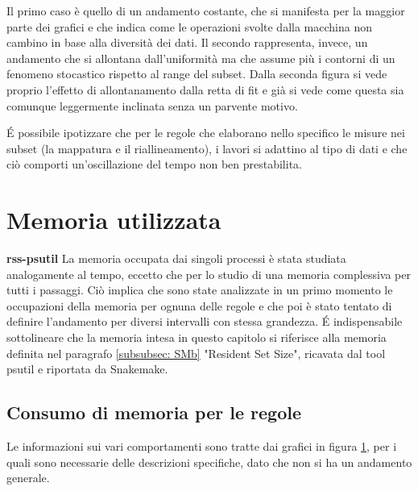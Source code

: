 Il primo caso è quello di un andamento costante, che si manifesta per la maggior parte dei grafici e che indica come le operazioni svolte dalla macchina non cambino in base alla diversità dei dati.
Il secondo rappresenta, invece, un andamento che si allontana dall'uniformità ma che assume più i contorni di un fenomeno stocastico rispetto al range del subset.
Dalla seconda figura si vede proprio l'effetto di allontanamento dalla retta di fit e già si vede come questa sia comunque leggermente inclinata senza un parvente motivo.

\'E possibile ipotizzare che per le regole che elaborano nello specifico le misure nei subset (la mappatura e il riallineamento), i lavori si adattino al tipo di dati e che ciò comporti un'oscillazione del tempo non ben prestabilita.

\section{Memoria utilizzata}
\textbf{rss-psutil}
La memoria occupata dai singoli processi è stata studiata analogamente al tempo, eccetto che per lo studio di una memoria complessiva per tutti i passaggi. 
Ciò implica che sono state analizzate in un primo momento le occupazioni della memoria per ognuna delle regole e che poi è stato tentato di definire l'andamento per diversi intervalli con stessa grandezza.
\'E indispensabile sottolineare che la memoria intesa in questo capitolo si riferisce alla memoria definita nel paragrafo \ref{subsubsec: SMb} "Resident Set Size", ricavata dal tool psutil e riportata da Snakemake. 

\subsection{Consumo di memoria per le regole}
Le informazioni sui vari comportamenti sono tratte dai grafici in figura \ref{fig:RSSr}, per i quali sono necessarie delle descrizioni specifiche, dato che non si ha un andamento generale. 
\begin{figure}[H]
\centering
{} \quad
{} \\
\end{figure}
\begin{figure}[H]
\ContinuedFloat
\centering
{} \quad
{} \\
\end{figure}
\begin{figure}[H]
\ContinuedFloat
\centering
{} 
\caption{}
\label{fig:RSSr}
\end{figure}

